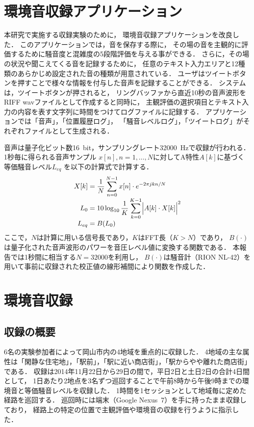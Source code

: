 \documentclass[autodetect-engine,dvi=dvipdfmx,ja=standard,
               a4,twoside,10pt]{bxjsarticle}
\begin{document}
\section{環境音収録アプリケーション}

本研究で実施する収録実験のために，
環境音収録アプリケーション\cite{Hara2014_ASJ1409}を改良した．
このアプリケーションでは，音を保存する際に，
その場の音を主観的に評価するために騒音度と混雑度の5段階評価を与える事ができる．
さらに，その場の状況や聞こえてくる音を記録するために，
任意のテキスト入力エリアと12種類のあらかじめ設定された音の種類が用意されている．
ユーザはツイートボタンを押すことで様々な情報を付与した音声を記録することができる．
システムは，ツイートボタンが押されると，
リングバッファから直近10秒の音声波形をRIFF wavファイルとして作成すると同時に，
主観評価の選択項目とテキスト入力の内容を表す文字列に時間をつけてログファイルに記録する．
アプリケーションでは「音声」，「位置履歴ログ」，
「騒音レベルログ」，「ツイートログ」がそれぞれファイルとして生成される．

音声は量子化ビット数16~bit，サンプリングレート32000~Hzで収録が行われる．
1秒毎に得られる音声サンプル $x[n], n=1,\dots,N$に対してA特性$A[k]$に基づく等価騒音レベル$L_{eq}$ を以下の計算式で計算する．
%
\begin{align}
    X[k] &= \frac{1}{N} \sum_{n=0}^{N-1} x[n] \cdot e^{-2 \pi j k n/N} \\[-3pt]
	L_0 &= 10 \log_{10} \frac{1}{K} \sum_{k=0}^{K-1} \Bigl| A[k] \cdot X[k] \Bigr|^2 \\[-3pt]
	L_{eq} &= B(L_0)
\end{align}
%
ここで，$N$は計算に用いる信号長であり，$K$はFFT長（$K>N$）であり，
$B(\cdot)$は量子化された音声波形のパワーを音圧レベル値に変換する関数である．
本報告では1秒間に相当する$N=32000$を利用し，
$B(\cdot)$は騒音計（RION NL-42）を用いて事前に収録された校正値の線形補間により関数を作成した．


\section{環境音収録}

\subsection{収録の概要}

6名の実験参加者によって岡山市内の4地域を重点的に収録した．
4地域の主な属性は「閑静な住宅地」，「駅前」，「駅に近い商店街」，「駅からやや離れた商店街」である．
収録は2014年11月22日から29日の間で，平日2日と土日2日の合計4日間として，
1日あたり2地点を3名ずつ巡回することで午前8時から午後9時までの環境音と等価騒音レベルを収録した．
1時間を1セッションとして地域毎に定めた経路を巡回する．
巡回時には端末（Google Nexus~7）を手に持ったまま収録しており，
経路上の特定の位置で主観評価や環境音の収録を行うように指示した．
\end{document}
